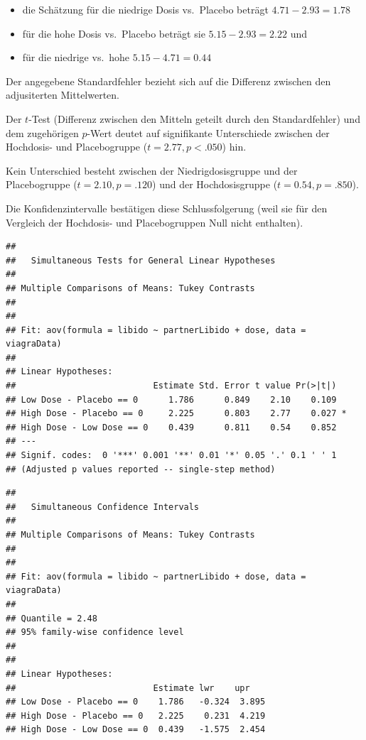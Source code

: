 \documentclass[]{article}
\providecommand{\tightlist}{%
  \setlength{\itemsep}{0pt}\setlength{\parskip}{0pt}}
\begin{document}
\begin{itemize}
\tightlist
\item
  die Schätzung für die niedrige Dosis vs.~Placebo beträgt
  \(4.71 - 2.93 = 1.78\)
\item
  für die hohe Dosis vs.~Placebo beträgt sie \(5.15 - 2.93 = 2.22\) und
\item
  für die niedrige vs.~hohe \(5.15 - 4.71 = 0.44\)
\end{itemize}

Der angegebene Standardfehler bezieht sich auf die Differenz zwischen
den adjusiterten Mittelwerten.

Der \(t\)-Test (Differenz zwischen den Mitteln geteilt durch den
Standardfehler) und dem zugehörigen \(p\)-Wert deutet auf signifikante
Unterschiede zwischen der Hochdosis- und Placebogruppe
(\(t = 2.77, p < .050\)) hin.

Kein Unterschied besteht zwischen der Niedrigdosisgruppe und der
Placebogruppe (\(t = 2.10, p = .120\)) und der Hochdosisgruppe
(\(t = 0.54, p = .850\)).

Die Konfidenzintervalle bestätigen diese Schlussfolgerung (weil sie für
den Vergleich der Hochdosis- und Placebogruppen Null nicht enthalten).

\begin{verbatim}
## 
##   Simultaneous Tests for General Linear Hypotheses
## 
## Multiple Comparisons of Means: Tukey Contrasts
## 
## 
## Fit: aov(formula = libido ~ partnerLibido + dose, data = viagraData)
## 
## Linear Hypotheses:
##                           Estimate Std. Error t value Pr(>|t|)  
## Low Dose - Placebo == 0      1.786      0.849    2.10    0.109  
## High Dose - Placebo == 0     2.225      0.803    2.77    0.027 *
## High Dose - Low Dose == 0    0.439      0.811    0.54    0.852  
## ---
## Signif. codes:  0 '***' 0.001 '**' 0.01 '*' 0.05 '.' 0.1 ' ' 1
## (Adjusted p values reported -- single-step method)
\end{verbatim}

\begin{verbatim}
## 
##   Simultaneous Confidence Intervals
## 
## Multiple Comparisons of Means: Tukey Contrasts
## 
## 
## Fit: aov(formula = libido ~ partnerLibido + dose, data = viagraData)
## 
## Quantile = 2.48
## 95% family-wise confidence level
##  
## 
## Linear Hypotheses:
##                           Estimate lwr    upr   
## Low Dose - Placebo == 0    1.786   -0.324  3.895
## High Dose - Placebo == 0   2.225    0.231  4.219
## High Dose - Low Dose == 0  0.439   -1.575  2.454
\end{verbatim}
\end{document}
